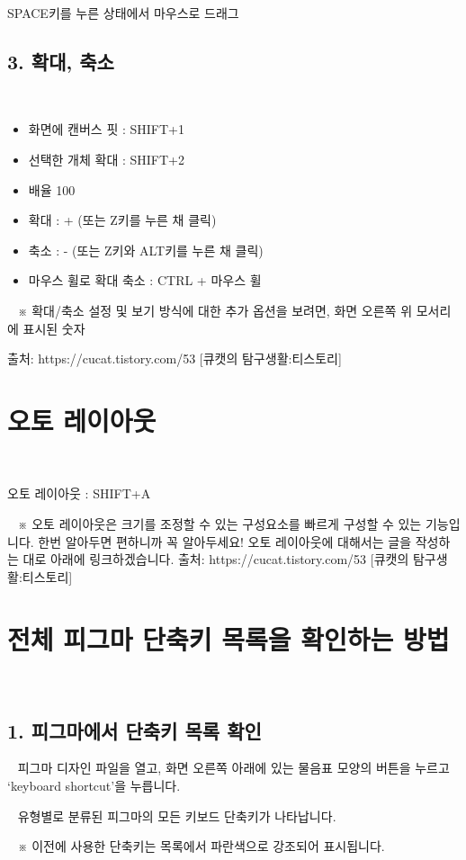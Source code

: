 \documentclass[12pt, a4paper, oneside]{book}
\begin{document}
SPACE키를 누른 상태에서 마우스로 드래그


	\subsection{3. 확대, 축소}
 
			\begin{itemize}[topsep=0.0em, parsep=0.0em, itemsep=0em, leftmargin=6.0em, labelwidth=3em, labelsep=1em] 
			\item 	화면에 캔버스 핏 : SHIFT+1
			\item 	선택한 개체 확대 : SHIFT+2
			\item 	배율 100%
			\item 	확대 : + (또는 Z키를 누른 채 클릭)
			\item 	축소 : - (또는 Z키와 ALT키를 누른 채 클릭)
			\item 	마우스 휠로 확대 축소 : CTRL + 마우스 휠
			\end{itemize}


 
※ 확대/축소 설정 및 보기 방식에 대한 추가 옵션을 보려면, 화면 오른쪽 위 모서리에 표시된 숫자%

출처: https://cucat.tistory.com/53 [큐캣의 탐구생활:티스토리]


	\section{오토 레이아웃}
 

오토 레이아웃 : SHIFT+A

 
※ 오토 레이아웃은 크기를 조정할 수 있는 구성요소를 빠르게 구성할 수 있는 기능입니다. 한번 알아두면 편하니까 꼭 알아두세요! 오토 레이아웃에 대해서는 글을 작성하는 대로 아래에 링크하겠습니다.
출처: https://cucat.tistory.com/53 [큐캣의 탐구생활:티스토리]


	\section{전체 피그마 단축키 목록을 확인하는 방법}
 
	\subsection{1. 피그마에서 단축키 목록 확인}
 
피그마 디자인 파일을 열고, 화면 오른쪽 아래에 있는 물음표 모양의 버튼을 누르고 ‘keyboard shortcut’을 누릅니다.
 
 

 
유형별로 분류된 피그마의 모든 키보드 단축키가 나타납니다. 
 

 
※ 이전에 사용한 단축키는 목록에서 파란색으로 강조되어 표시됩니다.
\end{document}
